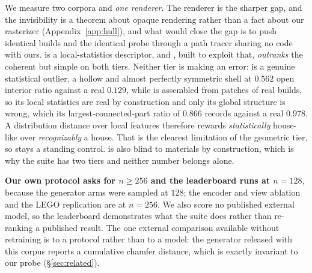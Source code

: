 We measure two corpora and \emph{one renderer}. The renderer is the sharper gap, and the
invisibility is a
theorem about opaque rendering rather than a fact about our rasterizer
(Appendix~\ref{app:hull}), and what would close the gap is to push identical builds and the
identical probe through a path tracer sharing no code with ours. \vkid{} is a
local-statistics descriptor, and \patchstitch{}, built to exploit that, \emph{outranks} the
coherent but simple \gabled{} on both tiers. Neither tier is making an error:
\gabled{} is a genuine statistical outlier, a hollow and almost perfectly symmetric shell at
$0.562$ open interior ratio against a real $0.129$, while \patchstitch{} is assembled from
patches of real builds, so its local statistics are real by construction and only its global
structure is wrong, which its largest-connected-part ratio of $0.866$ records against a real
$0.978$. A distribution distance over local features therefore rewards \emph{statistically}
house-like over \emph{recognizably} a house. That is the clearest limitation of the geometric
tier, so \patchstitch{} stays a standing control. \vkid{} is also blind to materials by
construction, which is why the suite has two tiers and neither number belongs alone.

\textbf{Our own protocol asks for $n \geq 256$ and the leaderboard runs at $n{=}128$},
because the generator arms were sampled at $128$; the encoder and view ablation and the
LEGO replication are at $n{=}256$. We also score no published external model, so the
leaderboard demonstrates what the suite does rather than re-ranking a published result. The
one external comparison available without retraining is to a protocol rather than to a
model: the generator released with this corpus \citep{chen2019voxelcnn} reports a
cumulative chamfer distance, which is exactly invariant to our probe
(\S\ref{sec:related}).
